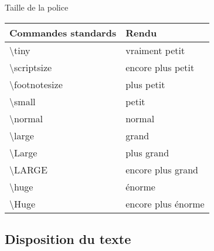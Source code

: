 \begin{frame}{Taille de la police}
	\begin{tabularx}{\textwidth}{l|l}
		\arrayrulecolor{grisPrimaire!40}
		\textbf{Commandes standards} 	& 	\textbf{Rendu}	\\
		\hline
		\textbackslash tiny				&	{\tiny vraiment petit}	\\
		\textbackslash scriptsize		&	{\scriptsize encore plus petit}	\\
		\textbackslash footnotesize		&	{\footnotesize plus petit}	\\
		\textbackslash small			&	{\small petit}	\\
		\textbackslash normal			&	{\normalsize normal}	\\
		\textbackslash large			&	{\large grand}	\\
		\textbackslash Large			&	{\Large plus grand}	\\
		\textbackslash LARGE			&	{\LARGE encore plus grand}	\\
		\textbackslash huge				&	{\huge énorme}	\\
		\textbackslash Huge				&	{\Huge encore plus énorme}		
	\end{tabularx}
\end{frame}

\subsection{Disposition du texte}